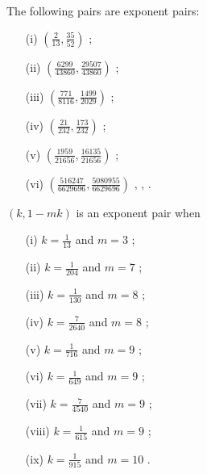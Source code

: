 \begin{theorem}\label{exp_pair_bombieri-iwaniec}  The following pairs are exponent pairs:
\begin{itemize}
\item[(i)] $(\frac{2}{13}, \frac{35}{52})$ \cite{huxley_watt_exponential_1990};
\item[(ii)] $(\frac{6299}{43860}, \frac{29507}{43860})$ \cite[Table 17.3]{huxley_area_1996};
\item[(iii)] $(\frac{771}{8116}, \frac{1499}{2029})$ \cite[p. 285]{sargos_points_1995};
\item[(iv)] $(\frac{21}{232}, \frac{173}{232})$ \cite[p. 286]{sargos_points_1995};
\item[(v)] $(\frac{1959}{21656}, \frac{16135}{21656})$ \cite[p. 286]{sargos_points_1995};
\item[(vi)] $(\frac{516247}{6629696}, \frac{5080955}{6629696})$ \cite{huxley_exponential_2001}, \cite[Table 19.2]{huxley_area_1996}, \cite{robert_fourth_2002}.
\end{itemize}
\end{theorem}

\literature
{}

\begin{theorem}\label{exp_pair_deriv_test} $(k,1-mk)$ is an exponent pair when
    \begin{itemize}
\item[(i)] $k=\frac{1}{13}$ and $m=3$ \cite[Theorem 1]{robert_fourth_2002};
\item[(ii)] $k = \frac{1}{204}$ and $m=7$ \cite[p. 231]{sargos_analog_2003};
\item[(iii)] $k = \frac{1}{130}$ and $m=8$ \cite[(1.1)]{robert_2002};
\item[(iv)] $k = \frac{7}{2640}$ and $m=8$ \cite[p. 231]{sargos_analog_2003};
\item[(v)] $k = \frac{1}{716}$ and $m=9$ \cite[p. 231]{sargos_analog_2003};
\item[(vi)] $k = \frac{1}{649}$ and $m=9$ \cite{Robert_Sargos_2001};
\item[(vii)] $k = \frac{7}{4540}$ and $m=9$ \cite[(1.2)]{robert_2002};
\item[(viii)] $k = \frac{1}{615}$ and $m=9$ \cite[(1.1)]{robert_2002};
\item[(ix)] $k = \frac{1}{915}$ and $m=10$ \cite[Th\'eor\`eme 2]{robert_2002b}.
\end{itemize}
\end{theorem}

